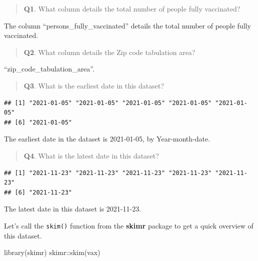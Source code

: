 \documentclass[
]{article}
\newenvironment{Shaded}{\begin{snugshade}}{\end{snugshade}}
\newcommand{\FunctionTok}[1]{\textcolor[rgb]{0.00,0.00,0.00}{#1}}
\newcommand{\NormalTok}[1]{#1}
\newcommand{\SpecialCharTok}[1]{\textcolor[rgb]{0.00,0.00,0.00}{#1}}
\begin{document}
\begin{quote}
\textbf{Q1}. What column details the total number of people fully
vaccinated?
\end{quote}

The column ``persons\_fully\_vaccinated'' details the total number of
people fully vaccinated.

\begin{quote}
\textbf{Q2}. What column details the Zip code tabulation area?
\end{quote}

``zip\_code\_tabulation\_area''.

\begin{quote}
\textbf{Q3}. What is the earliest date in this dataset?
\end{quote}

\begin{Shaded}
\end{Shaded}

\begin{verbatim}
## [1] "2021-01-05" "2021-01-05" "2021-01-05" "2021-01-05" "2021-01-05"
## [6] "2021-01-05"
\end{verbatim}

The earliest date in the dataset is 2021-01-05, by Year-month-date.

\begin{quote}
\textbf{Q4}. What is the latest date in this dataset?
\end{quote}

\begin{Shaded}
\end{Shaded}

\begin{verbatim}
## [1] "2021-11-23" "2021-11-23" "2021-11-23" "2021-11-23" "2021-11-23"
## [6] "2021-11-23"
\end{verbatim}

The latest date in this dataset is 2021-11-23.

Let's call the \texttt{skim()} function from the \textbf{skimr} package
to get a quick overview of this dataset.

\begin{Shaded}
\begin{Highlighting}[]
\FunctionTok{library}\NormalTok{(skimr)}
\NormalTok{skimr}\SpecialCharTok{::}\FunctionTok{skim}\NormalTok{(vax)}
\end{Highlighting}
\end{Shaded}
\end{document}
